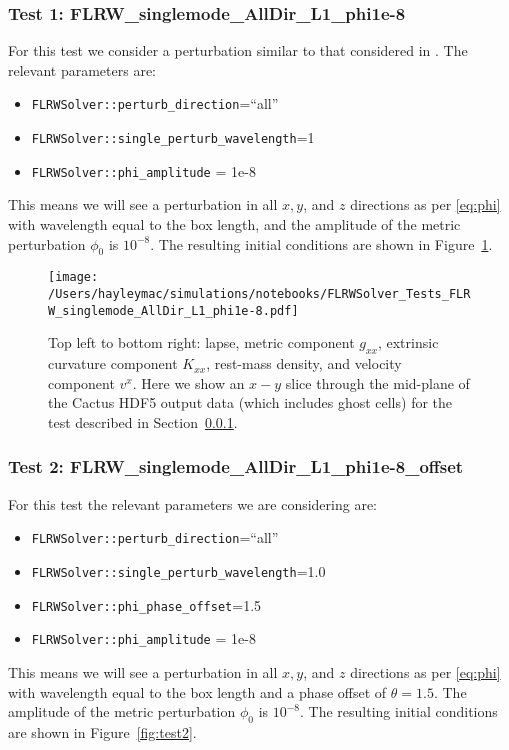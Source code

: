 \subsubsection{Test 1: FLRW\_singlemode\_AllDir\_L1\_phi1e-8} \label{sec:test1}

For this test we consider a perturbation similar to that considered in \cite{macpherson2017}. The relevant parameters are:

\begin{itemize}
	\item \texttt{FLRWSolver::perturb\_direction}=``all''
	\item \texttt{FLRWSolver::single\_perturb\_wavelength}=1
	\item \texttt{FLRWSolver::phi\_amplitude} = 1e-8
\end{itemize}
This means we will see a perturbation in all $x,y$, and $z$ directions as per \eqref{eq:phi} with wavelength equal to the box length, and the amplitude of the metric perturbation $\phi_0$ is $10^{-8}$. The resulting initial conditions are shown in Figure~\ref{fig:test1}. 

\begin{figure}[h!]
	\begin{center}
	   \texttt{[image: /Users/hayleymac/simulations/notebooks/FLRWSolver\_Tests\_FLRW\_singlemode\_AllDir\_L1\_phi1e-8.pdf]}
	\end{center}
	\caption{Top left to bottom right: lapse, metric component $g_{xx}$, extrinsic curvature component $K_{xx}$, rest-mass density, and velocity component $v^x$. Here we show an $x-y$ slice through the mid-plane of the Cactus HDF5 output data (which includes ghost cells) for the test described in Section~\ref{sec:test1}.}
	\label{fig:test1}
\end{figure}



\subsubsection{Test 2: FLRW\_singlemode\_AllDir\_L1\_phi1e-8\_offset} \label{sec:test2}

For this test the relevant parameters we are considering are:

\begin{itemize}
	\item \texttt{FLRWSolver::perturb\_direction}=``all''
	\item \texttt{FLRWSolver::single\_perturb\_wavelength}=1.0
	\item \texttt{FLRWSolver::phi\_phase\_offset}=1.5
	\item \texttt{FLRWSolver::phi\_amplitude} = 1e-8
\end{itemize}
This means we will see a perturbation in all $x,y$, and $z$ directions as per \eqref{eq:phi} with wavelength equal to the box length and a phase offset of $\theta=1.5$. The amplitude of the metric perturbation $\phi_0$ is $10^{-8}$. The resulting initial conditions are shown in Figure~\ref{fig:test2}.

